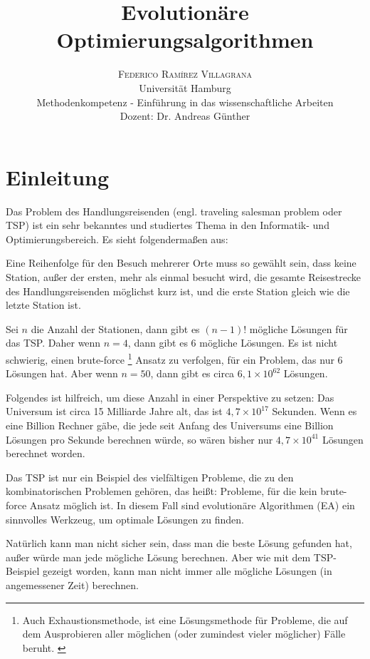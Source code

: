 \documentclass[twoside,twocolumn]{article}
\title{Evolutionäre Optimierungsalgorithmen} %
\author {
	\textsc{Federico Ramírez Villagrana} \\[1ex]
	\normalsize Universität Hamburg \\
	\normalsize Methodenkompetenz - Einführung in das wissenschaftliche Arbeiten \\
	\normalsize Dozent: Dr. Andreas Günther
}
\date{} %
\newcommand{\e}[1]{\times 10^{#1}}
\begin{document}
\maketitle


\section{Einleitung}
Das Problem des Handlungsreisenden (engl. traveling salesman problem oder TSP) ist ein sehr bekanntes und studiertes Thema in den Informatik- und Optimierungsbereich. Es sieht folgendermaßen aus:\par
Eine Reihenfolge für den Besuch mehrerer Orte muss so gewählt sein, dass keine Station, außer der ersten, mehr als einmal besucht wird, die gesamte Reisestrecke des Handlungsreisenden möglichst kurz ist, und die erste Station gleich wie die letzte Station ist. \cite{wiki_tsp}\par
Sei $n$ die Anzahl der Stationen, dann gibt es $(n-1)!$ mögliche Lösungen für das TSP. Daher wenn $n=4$, dann gibt es $6$ mögliche Lösungen. Es ist nicht schwierig, einen brute-force \footnote{Auch Exhaustionsmethode, ist eine Lösungsmethode für Probleme, die auf dem Ausprobieren aller möglichen (oder zumindest vieler möglicher) Fälle beruht. \cite{wiki_brute_force}} Ansatz zu verfolgen, für ein Problem, das nur 6 Lösungen hat. Aber wenn $n=50$, dann gibt es circa $6,1\e{62}$ Lösungen.\par
Folgendes ist hilfreich, um diese Anzahl in einer Perspektive zu setzen: Das Universum ist circa 15 Milliarde Jahre alt, das ist $4,7\e{17}$ Sekunden. Wenn es eine Billion Rechner gäbe, die jede seit Anfang des Universums eine Billion Lösungen pro Sekunde berechnen würde, so wären bisher nur $4,7\e{41}$ Lösungen berechnet worden.\par
Das TSP ist nur ein Beispiel des vielfältigen Probleme, die zu den kombinatorischen Problemen gehören, das heißt: Probleme, für die kein brute-force Ansatz möglich ist. In diesem Fall sind evolutionäre Algorithmen (EA) ein sinnvolles Werkzeug, um optimale Lösungen zu finden.\par
Natürlich kann man nicht sicher sein, dass man die beste Lösung gefunden hat, außer würde man jede mögliche Lösung berechnen. Aber wie mit dem TSP-Beispiel gezeigt worden, kann man nicht immer alle mögliche Lösungen (in angemessener Zeit) berechnen.
\end{document}
